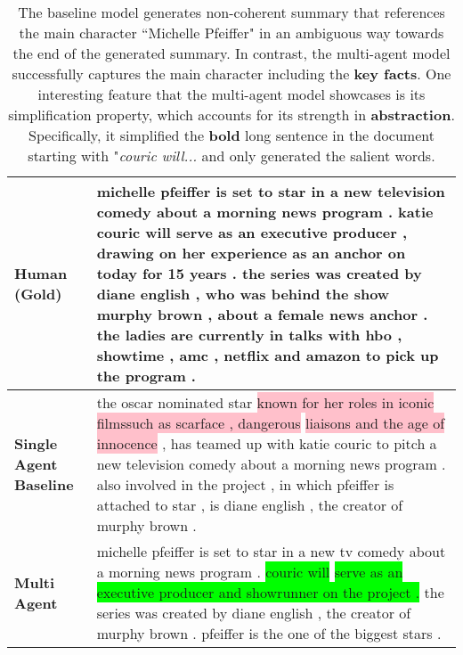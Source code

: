 \documentclass[11pt,a4paper]{article}
\begin{document}
\begin{table*}[t]
\begin{center}
\begin{tabular}{|P{1.5cm}@{}| p{13.8cm}|}
    \\ \hline
    \small  \textbf{Human (Gold)}  & michelle pfeiffer is set to star in a new television comedy about a morning news program . katie couric will serve as an executive producer , drawing on her experience as an anchor on today for 15 years . the series was created by diane english , who was behind the show murphy brown , about a female news anchor . the ladies are currently in talks with hbo , showtime , amc , netflix and amazon to pick up the program .
 \\ \hline
\small  \textbf{Single Agent Baseline} & the oscar nominated star \colorbox{pink}{known for her roles in iconic filmssuch as scarface , dangerous} \colorbox{pink}{liaisons and the age of innocence} , has teamed up with katie couric to pitch a new television comedy about a morning news program . also involved in the project , in which pfeiffer is attached to star , is diane english , the creator of murphy brown .

  \\\hline
\small  \textbf{Multi Agent} &  michelle pfeiffer is set to star in a new tv comedy about a morning news program . \colorbox{lime}{couric will} \colorbox{lime}{serve as an executive producer and showrunner on the project .} the series was created by diane english , the creator of murphy brown . pfeiffer is the one of the biggest stars .
 \\ \hline
    \end{tabular}
\end{center}
\vspace{-0.2in}
\caption{The baseline model generates non-coherent summary that references the main character ``Michelle Pfeiffer" in an ambiguous way towards the end of the generated summary. In contrast, the multi-agent model successfully captures the main character including the \textbf{key facts}. One interesting feature that the multi-agent model showcases is its simplification property, which accounts for its strength in \textbf{abstraction}. Specifically, it simplified the \textbf{bold} long sentence in the document starting with "\textit{couric will...} and only generated the salient words.}
    \label{app:sum2}
\end{table*}
\end{document}
